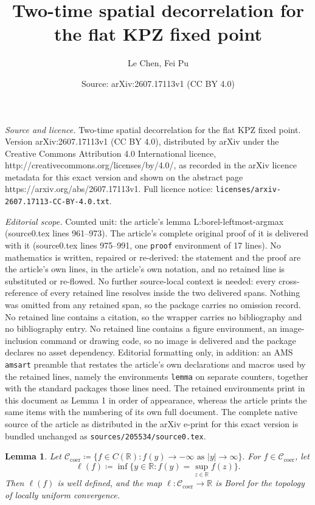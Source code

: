 \documentclass[10pt,a4paper]{amsart}
\title{Two-time spatial decorrelation for the flat KPZ fixed point}
\author{Le Chen, Fei Pu}
\date{Source: arXiv:2607.17113v1 (CC BY 4.0)}
\newtheorem{lemma}{Lemma}
\newcommand{\R}{\mathbb{R}}
\begin{document}
\maketitle

\noindent\emph{Source and licence.} Two-time spatial decorrelation for the flat KPZ fixed point. Version arXiv:2607.17113v1 (CC BY 4.0), distributed by arXiv under the Creative Commons Attribution 4.0 International licence, http://creativecommons.org/licenses/by/4.0/, as recorded in the arXiv licence metadata for this exact version and shown on the abstract page https://arxiv.org/abs/2607.17113v1. Full licence notice: \texttt{licenses/arxiv-2607.17113-CC-BY-4.0.txt}.\par\smallskip

\noindent\textit{Editorial scope.} Counted unit: the article's lemma L:borel-leftmost-argmax (source0.tex lines 961--973). The article's complete original proof of it is delivered with it (source0.tex lines 975--991, one \texttt{proof} environment of 17 lines). No mathematics is written, repaired or re-derived: the statement and the proof are the article's own lines, in the article's own notation, and no retained line is substituted or re-flowed.  No further source-local context is needed: every cross-reference of every retained line resolves inside the two delivered spans.  Nothing was omitted from any retained span, so the package carries no omission record.  No retained line contains a citation, so the wrapper carries no bibliography and no bibliography entry.  No retained line contains a figure environment, an image-inclusion command or drawing code, so no image is delivered and the package declares no asset dependency.  Editorial formatting only, in addition: an AMS \texttt{amsart} preamble that restates the article's own declarations and macros used by the retained lines, namely the environments \texttt{lemma} on separate counters, together with the standard packages those lines need.  The retained environments print in this document as Lemma 1 in order of appearance, whereas the article prints the same items with the numbering of its own full document.  The complete native source of the article as distributed in the arXiv e-print for this exact version is bundled unchanged as \texttt{sources/205534/source0.tex}.
\begin{lemma}\label{L:borel-leftmost-argmax}
  Let
  $
    \mathcal{C}_{\mathrm{coer}}
     \coloneqq \{f\in C(\R): f(y)\to-\infty \text{ as } |y|\to\infty\}.
  $
  For $f\in\mathcal{C}_{\mathrm{coer}}$, let
  \[
    \ell(f) \coloneqq \inf\{y\in\R: f(y)=\sup_{z\in\R} f(z)\}.
  \]
  Then $\ell(f)$ is well defined, and the map $\ell:\mathcal{C}_{\mathrm{coer}}\to\R$
  is Borel for the topology of locally uniform convergence.
\end{lemma}
\end{document}
